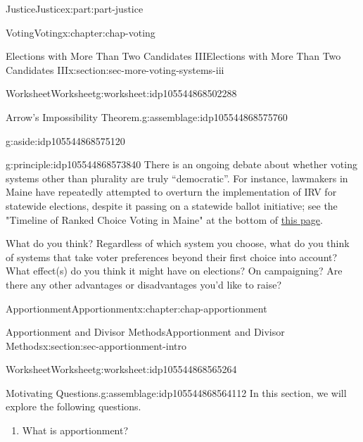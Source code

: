 \documentclass[oneside,10pt,]{book}
\numberwithin{equation}{section}
\begin{document}
\begin{partptx}{Justice}{}{Justice}{}{}{x:part:part-justice}
\begin{chapterptx}{Voting}{}{Voting}{}{}{x:chapter:chap-voting}
\begin{sectionptx}{Elections with More Than Two Candidates III}{}{Elections with More Than Two Candidates III}{}{}{x:section:sec-more-voting-systems-iii}
\begin{worksheet-subsection}{Worksheet}{}{Worksheet}{}{}{g:worksheet:idp105544868502288}
\begin{assemblage}{Arrow's Impossibility Theorem.}{g:assemblage:idp105544868575760}
\begin{aside}{}{g:aside:idp105544868575120}
\end{aside}
%
\end{assemblage}
\begin{principle}{}{}{g:principle:idp105544868573840}%
There is an ongoing debate about whether voting systems other than plurality are truly ``democratic''. For instance, lawmakers in Maine have repeatedly attempted to overturn the implementation of IRV for statewide elections, despite it passing on a statewide ballot initiative; see the "Timeline of Ranked Choice Voting in Maine" at the bottom of \href{http://www.rcvmaine.com}{this page}\footnotemark{}.%
\par
What do you think? Regardless of which system you choose, what do you think of systems that take voter preferences beyond their first choice into account? What effect(s) do you think it might have on elections? On campaigning? Are there any other advantages or disadvantages you'd like to raise?%
\end{principle}
%
\end{worksheet-subsection}
\restoregeometry
\end{sectionptx}
\end{chapterptx}
%
\typeout{************************************************}
\typeout{************************************************}
%
\begin{chapterptx}{Apportionment}{}{Apportionment}{}{}{x:chapter:chap-apportionment}
%
%
\typeout{************************************************}
\typeout{************************************************}
%
\begin{sectionptx}{Apportionment and Divisor Methods}{}{Apportionment and Divisor Methods}{}{}{x:section:sec-apportionment-intro}
%
%
\typeout{************************************************}
\typeout{************************************************}
%
\begin{worksheet-subsection}{Worksheet}{}{Worksheet}{}{}{g:worksheet:idp105544868565264}
\begin{assemblage}{Motivating Questions.}{g:assemblage:idp105544868564112}%
In this section, we will explore the following questions. %
\begin{enumerate}[label=(\alph*)]
\item{}What is apportionment?%

\end{enumerate}
\end{assemblage}
\end{worksheet-subsection}
\end{sectionptx}
\end{chapterptx}
\end{partptx}
\end{document}
